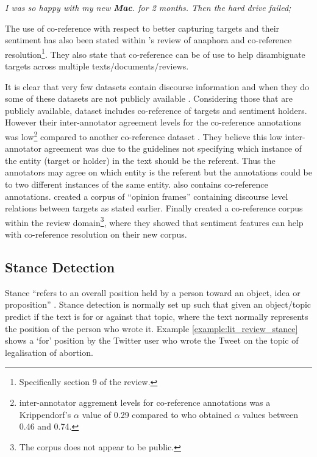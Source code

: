 \begin{example}
\textit{I was so happy with my new \textbf{Mac}. for 2 months. Then the hard drive failed;}
\caption{Negative sentiment towards the \textbf{Mac} due to the hard drive failing. This came from sentence ids 128:3, 128:4 and 128:5 of the laptop training dataset of \citet{pontiki-etal-2015-semeval}.}
\label{example:lit_review_discourse_sentiment_diff_sentence}
\end{example}

The use of co-reference with respect to better capturing targets and their sentiment has also been stated within \citet{sukthanker2020anaphora}'s review of anaphora and co-reference resolution\footnote{Specifically section 9 of the review.}. They also state that co-reference can be of use to help disambiguate targets across multiple texts\slash documents\slash reviews.

It is clear that very few datasets contain discourse information and when they do some of these datasets are not publicly available \citep{zhuang2006movie, stoyanov-cardie-2008-topic, van2015good}. Considering those that are publicly available, \citet{toprak-etal-2010-sentence} dataset includes co-reference of targets and sentiment holders. However their inter-annotator agreement levels for the co-reference annotations was low\footnote{\citet{toprak-etal-2010-sentence} inter-annotator aggrement levels for co-reference annotations was a Krippendorf’s $\alpha$ \citep{krippendorff2018content} value of 0.29 compared to \citet{passonneau-2004-computing} who obtained $\alpha$ values between 0.46 and 0.74.} compared to another co-reference dataset \citep{passonneau-2004-computing}. They believe this low inter-annotator agreement was due to the guidelines not specifying which instance of the entity (target or holder) in the text should be the referent. Thus the annotators may agree on which entity is the referent but the annotations could be to two different instances of the same entity. \citet{kessler2010icwsm} also contains co-reference annotations. \citet{somasundaran-etal-2008-discourse} created a corpus of ``opinion frames'' containing discourse level relations between targets as stated earlier. Finally \citet{ding-liu-2010-resolving} created a co-reference corpus within the review domain\footnote{The corpus does not appear to be public.}, where they showed that sentiment features can help with co-reference resolution on their new corpus.

\subsection{Stance Detection}
Stance ``refers to an overall position held by a person toward an object, idea or proposition'' \citep{somasundaran-wiebe-2010-recognizing}. Stance detection is normally set up such that given an object/topic predict if the text is for or against that topic, where the text normally represents the position of the person who wrote it. Example \ref{example:lit_review_stance} shows a `for' position by the Twitter user who wrote the Tweet on the topic of legalisation of abortion. 


